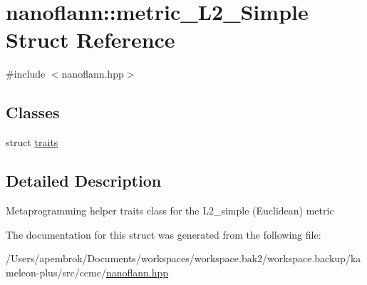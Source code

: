 \hypertarget{structnanoflann_1_1metric___l2___simple}{\section{nanoflann\-:\-:metric\-\_\-\-L2\-\_\-\-Simple Struct Reference}
\label{structnanoflann_1_1metric___l2___simple}
}


{\ttfamily \#include $<$nanoflann.\-hpp$>$}

\subsection*{Classes}
\begin{DoxyCompactItemize}
\item 
struct \hyperlink{structnanoflann_1_1metric___l2___simple_1_1traits}{traits}
\end{DoxyCompactItemize}


\subsection{Detailed Description}
Metaprogramming helper traits class for the L2\-\_\-simple (Euclidean) metric 

The documentation for this struct was generated from the following file\-:\begin{DoxyCompactItemize}
\item 
/\-Users/apembrok/\-Documents/workspaces/workspace.\-bak2/workspace.\-backup/kameleon-\/plus/src/ccmc/\hyperlink{nanoflann_8hpp}{nanoflann.\-hpp}\end{DoxyCompactItemize}
